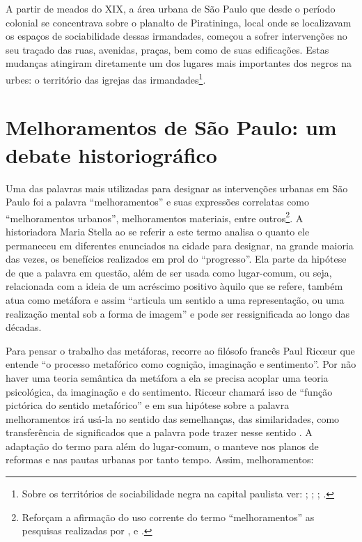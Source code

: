 \begin{refsection}
    A partir de meados do XIX, a área urbana de São Paulo que desde o período colonial se concentrava sobre o planalto de Piratininga, local onde se localizavam os espaços de sociabilidade dessas irmandades, começou a sofrer intervenções no seu traçado das ruas, avenidas, praças, bem como de suas edificações. Estas mudanças atingiram diretamente um dos lugares mais importantes dos negros na urbes: o território das igrejas das irmandades\footnote{Sobre os territórios de sociabilidade negra na capital paulista ver: ; ; ; .}.

    \section{Melhoramentos de São Paulo: um debate historiográfico}

    Uma das palavras mais utilizadas para designar as intervenções urbanas em São Paulo foi a palavra ``melhoramentos'' e suas expressões correlatas como ``melhoramentos urbanos'', melhoramentos materiais, entre outros\footnote{Reforçam a afirmação do uso corrente do termo ``melhoramentos'' as pesquisas realizadas por \textcite{Bresciani2001Melhoramentos}, \textcite{Cerasoli2004Modernizacao} e \textcite{Borin2019Passeios}.}. A historiadora Maria Stella \textcite{Bresciani2001Melhoramentos} ao se referir a este termo analisa o quanto ele permaneceu em diferentes enunciados na cidade para designar, na grande maioria das vezes, os benefícios realizados em prol do ``progresso''. Ela parte da hipótese de que a palavra em questão, além de ser usada como lugar-comum, ou seja, relacionada com a ideia de um acréscimo positivo àquilo que se refere, também atua como metáfora e assim ``articula um sentido a uma representação, ou uma realização mental sob a forma de imagem'' \cite[p.~343--366]{Bresciani2001Melhoramentos} e pode ser ressignificada ao longo das décadas.

    Para pensar o trabalho das metáforas, \textcite{Bresciani2001Melhoramentos} recorre ao filósofo francês Paul Ricœur que entende ``o processo metafórico como cognição, imaginação e sentimento''. Por não haver uma teoria semântica da metáfora a ela se precisa acoplar uma teoria psicológica, da imaginação e do sentimento. Ricœur chamará isso de ``função pictórica do sentido metafórico'' e \textcite{Bresciani2001Melhoramentos} em sua hipótese sobre a palavra melhoramentos irá usá-la no sentido das semelhanças, das similaridades, como transferência de significados que a palavra pode trazer nesse sentido \cite[p.~350]{Bresciani2001Melhoramentos}. A adaptação do termo para além do lugar-comum, o manteve nos planos de reformas e nas pautas urbanas por tanto tempo. Assim, melhoramentos: 


\end{refsection}

